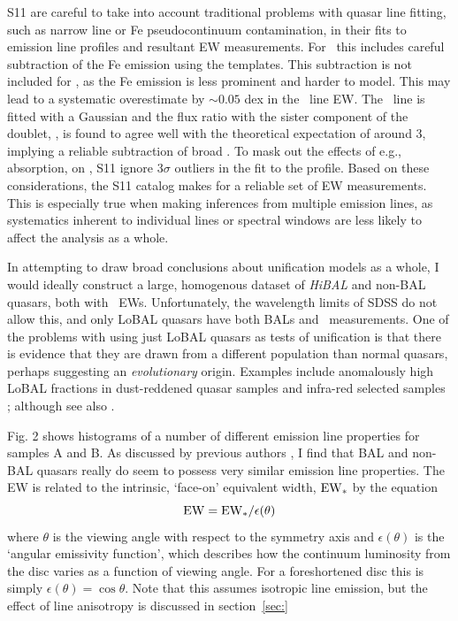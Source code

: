 S11 are careful to take into account traditional problems with quasar line fitting,
such as narrow line or Fe pseudocontinuum contamination, in their fits to 
emission line profiles and resultant EW measurements. For \mgline\
this includes careful subtraction of the Fe emission using the \cite{vestergaard2001}
templates. This subtraction is not included for \civfull,
as the Fe emission is less prominent and harder to model. This may lead to
a systematic overestimate by $\sim0.05$ dex in the \civ\ line EW. 
The \oiiifull\ line is fitted
with a Gaussian and the flux ratio with the sister component 
of the doublet, \oiiidoublet, is found to agree well with the theoretical
expectation of around 3, implying a reliable subtraction of broad \hb.
To mask out the effects of e.g., absorption, on \civ, S11 ignore 
$3\sigma$ outliers in the fit to the profile. Based on these
considerations, the S11 catalog makes for a reliable set of EW 
measurements. This is especially true when making inferences from 
multiple emission lines, as systematics inherent to individual lines 
or spectral windows are less likely to affect the analysis as a whole.

In attempting to draw broad conclusions about unification models as a whole,
I would ideally construct a large, homogenous dataset of 
{\em HiBAL} and non-BAL quasars, both with \oiiifull\ EWs. Unfortunately,
the wavelength limits of SDSS do not allow this, and only LoBAL quasars have 
both BALs and \ewo\ measurements. One of the problems with
using just LoBAL quasars as tests of unification is that there is evidence 
that they are drawn from a different population than normal quasars, perhaps
suggesting an {\em evolutionary} origin. Examples include anomalously 
high LoBAL fractions in dust-reddened quasar samples \citep{urrutia2009} 
and infra-red selected samples \citep{dai2012}; 
although see also \cite{lazarova2012}.


Fig. 2 shows histograms of a number of different 
emission line properties for samples A and B. 
As discussed by previous authors \cite[e.g.][]{weymann1991}, I find that BAL
and non-BAL quasars really do seem to possess very similar emission line 
properties. The EW is related to the intrinsic, `face-on' equivalent width,
${\rm EW}_*$ by the equation
\begin{equation}
{\rm EW} = {\rm EW}_* /\epsilon(\theta)
\end{equation}
where $\theta$ is the viewing angle with respect to the symmetry axis 
and $\epsilon(\theta)$ is the `angular emissivity function', which describes 
how the continuum luminosity from the disc varies as a function of viewing angle.
For a foreshortened disc this is simply $\epsilon(\theta) = \cos \theta$. 
Note that this assumes isotropic line emission, but the effect of line
anisotropy is discussed in section~\ref{sec:}

